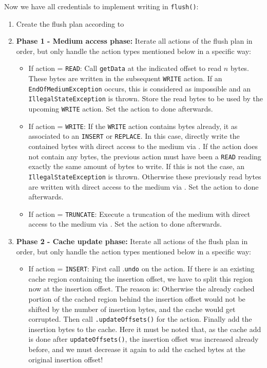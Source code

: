 Now we have all credentials to implement writing in \texttt{flush()}:
\begin{enumerate}
\item Create the flush plan according to 
\item \textbf{Phase 1 - Medium access phase:} Iterate all actions of the flush plan in order, but only handle the action types mentioned below in a specific way:
\begin{itemize}
\item If action = \texttt{READ}: Call \texttt{getData} at the indicated offset to read $n$ bytes. These bytes are written in the subsequent \texttt{WRITE} action. If an \\ \texttt{EndOfMediumException} occurs, this is considered as impossible and an \texttt{IllegalStateException} is thrown. Store the read bytes to be used by the upcoming \texttt{WRITE} action. Set the action to done afterwards.
\item If action = \texttt{WRITE}: If the \texttt{WRITE} action contains bytes already, it as associated to an \texttt{INSERT} or \texttt{REPLACE}. In this case, directly write the contained bytes with direct access to the medium via \IMediumAccessor{}. If the action does not contain any bytes, the previous action must have been a \texttt{READ} reading exactly the same amount of bytes to write. If this is not the case, an \texttt{IllegalStateException} is thrown. Otherwise these previously read bytes are written with direct access to the medium via \IMediumAccessor{}. Set the action to done afterwards.
\item If action = \texttt{TRUNCATE}: Execute a truncation of the medium with direct access to the medium via \IMediumAccessor{}. Set the action to done afterwards.
\end{itemize}
\item \textbf{Phase 2 - Cache update phase:} Iterate all actions of the flush plan in order, but only handle the action types mentioned below in a specific way:
\begin{itemize}
\item If action = \texttt{INSERT}: First call \MediumChangeManager{}.\texttt{undo} on the action. If there is an existing cache region containing the insertion offset, we have to split this region now at the insertion offset. The reason is: Otherwise the already cached portion of the cached region behind the insertion offset would not be shifted by the number of insertion bytes, and the cache would get corrupted. Then call \MediumReferenceRepository{}\texttt{.updateOffsets()} for the action. Finally add the insertion bytes to the cache. Here it must be noted that, as the cache add is done after \texttt{updateOffsets()}, the insertion offset was increased already before, and we must decrease it again to add the cached bytes at the original insertion offset!

\end{itemize}
\end{enumerate}
